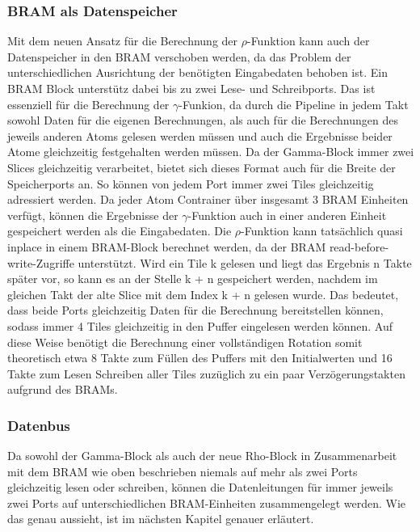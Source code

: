 \subsubsection{BRAM als Datenspeicher}
Mit dem neuen Ansatz für die Berechnung der $\rho$-Funktion kann auch der Datenspeicher in den BRAM verschoben werden,
da das Problem der unterschiedlichen Ausrichtung der benötigten Eingabedaten behoben ist. Ein BRAM Block unterstütz
dabei bis zu zwei Lese- und Schreibports. Das ist essenziell für die Berechnung der $\gamma$-Funkion,
da durch die Pipeline in jedem Takt sowohl Daten für die eigenen Berechnungen, als auch für die Berechnungen des
jeweils anderen Atoms gelesen werden müssen und auch die Ergebnisse beider Atome gleichzeitig festgehalten werden müssen.
Da der Gamma-Block immer zwei Slices gleichzeitig verarbeitet, bietet sich dieses Format auch für die Breite der Speicherports an.
So können von jedem Port immer zwei Tiles gleichzeitig adressiert werden. Da jeder Atom Contrainer über insgesamt 3 BRAM Einheiten verfügt,
können die Ergebnisse der $\gamma$-Funktion auch in einer anderen Einheit gespeichert werden als die Eingabedaten.
Die $\rho$-Funktion kann tatsächlich quasi inplace in einem BRAM-Block berechnet werden, da der BRAM read-before-write-Zugriffe unterstützt.
Wird ein Tile k gelesen und liegt das Ergebnis n Takte später vor, so kann es an der Stelle k + n gespeichert werden,
nachdem im gleichen Takt der alte Slice mit dem Index k + n gelesen wurde. Das bedeutet, dass beide Ports gleichzeitig
Daten für die Berechnung bereitstellen können, sodass immer 4 Tiles gleichzeitig in den Puffer eingelesen werden können.
Auf diese Weise benötigt die Berechnung einer vollständigen Rotation somit theoretisch etwa 8 Takte zum Füllen des Puffers mit den Initialwerten
und 16 Takte zum Lesen Schreiben aller Tiles zuzüglich zu ein paar Verzögerungstakten aufgrund des BRAMs.

\subsubsection{Datenbus}
Da sowohl der Gamma-Block als auch der neue Rho-Block in Zusammenarbeit mit dem BRAM wie oben beschrieben
niemals auf mehr als zwei Ports gleichzeitig lesen oder schreiben,
können die Datenleitungen für immer jeweils zwei Ports auf unterschiedlichen BRAM-Einheiten zusammengelegt werden.
Wie das genau aussieht, ist im nächsten Kapitel genauer erläutert.